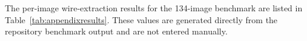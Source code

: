The per-image wire-extraction results for the 134-image benchmark are listed in
Table~\ref{tab:appendixresults}. These values are generated directly from the
repository benchmark output and are not entered manually.

\begin{table}[H]
\centering
\caption{Per-image wire-extraction results on the 134-image benchmark.}

\label{tab:appendixresults}
\end{table}
